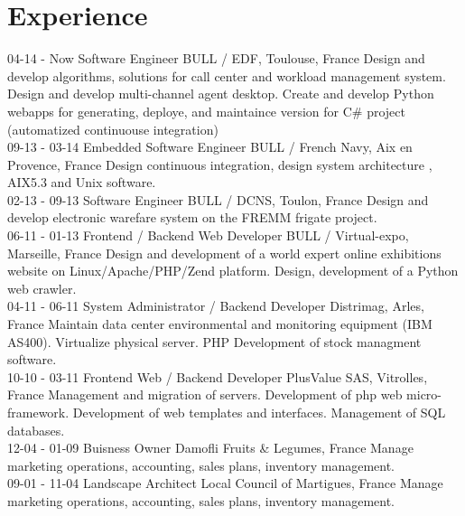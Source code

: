\documentclass[]{friggeri-cv}
\begin{document}
\section{Experience}
\begin{entrylist}
  \entry
    {04-14 - Now}
    {Software Engineer}
    {BULL / EDF, Toulouse, France}
    {Design and develop algorithms, solutions for call center and workload management system. Design and develop multi-channel agent desktop.
    Create and develop Python webapps for generating, deploye, and maintaince version for C\# project (automatized continuouse integration)\\}
  \entry
    {09-13 - 03-14}
    {Embedded Software Engineer}
    {BULL / French Navy, Aix en Provence, France}
    {Design continuous integration, design system architecture , AIX5.3 and Unix software.\\}
    \entry
    {02-13 - 09-13}
    {Software Engineer}
    {BULL / DCNS, Toulon, France}
    {Design and develop electronic warefare system on the FREMM frigate project.\\}
    \entry
    {06-11 - 01-13}
    {Frontend / Backend Web Developer}
    {BULL / Virtual-expo, Marseille, France}
    {Design and development of a world expert online exhibitions website on Linux/Apache/PHP/Zend platform. Design, development of a Python web crawler.\\}
    \entry
    {04-11 - 06-11}
    {System Administrator / Backend Developer}
    {Distrimag, Arles, France}
    {Maintain data center environmental and monitoring equipment (IBM AS400). Virtualize physical server. PHP Development of stock managment software.\\}
    \entry
    {10-10 - 03-11}
    {Frontend Web / Backend Developer}
    {PlusValue SAS, Vitrolles, France}
    {Management and migration of servers. Development of php web micro-framework. Development of web templates and interfaces. Management of SQL databases.\\}
    \entry
    {12-04 - 01-09}
    {Buisness Owner}
    {Damofli Fruits \& Legumes, France}
    {Manage marketing operations, accounting, sales plans, inventory management.\\}
    \entry
    {09-01 - 11-04}
    {Landscape Architect}
    {Local Council of Martigues, France}
    {Manage marketing operations, accounting, sales plans, inventory management.}
\end{entrylist}

\newpage
\end{document}
